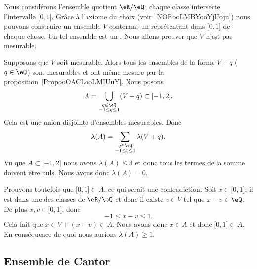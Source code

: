 \begin{example}      \label{EXooCZCFooRPgKjj}
	Nous considérons l'ensemble quotient \( \eR/\eQ\); chaque classe intersecte l'intervalle \( \mathopen[ 0 , 1 \mathclose]\). Grâce à l'axiome du choix (voir~\ref{NORooLMBYooYjUoju}) nous pouvons construire un ensemble \( V\) contenant un représentant dans \( \mathopen[ 0 , 1 \mathclose]\) de chaque classe. Un tel ensemble est un . Nous allons prouver que \( V\) n'est pas mesurable.

	Supposons que \( V\) soit mesurable. Alors tous les ensembles de la forme \( V+q\) (\( q\in \eQ\)) sont mesurables et ont même mesure par la proposition~\ref{PropooOACLooLMIUuY}. Nous posons
	\begin{equation}
		A=\bigcup_{\substack{q\in\eQ\\-1\leq q\leq 1}}(V+q)\subset\mathopen[ -1 , 2 \mathclose].
	\end{equation}
	Cela est une union disjointe d'ensembles mesurables. Donc
	\begin{equation}
		\lambda(A)=\sum_{\substack{q\in\eQ\\-1\leq q\leq 1}}\lambda(V+q).
	\end{equation}
	Vu que \( A\subset\mathopen[ -1 , 2 \mathclose]\) nous avons \( \lambda(A)\leq 3\) et donc tous les termes de la somme doivent être nuls. Nous avons donc \( \lambda(A)=0\).

	Prouvons toutefois que \( \mathopen[ 0 , 1 \mathclose]\subset A\), ce qui serait une contradiction. Soit \( x\in\mathopen[ 0 , 1 \mathclose]\); il est dans une des classes de \( \eR/\eQ\) et donc il existe \( v\in V\) tel que \( x-v\in \eQ\). De plus \( x,v\in \mathopen[ 0 , 1 \mathclose]\), donc
	\begin{equation}
		-1\leq x-v\leq 1.
	\end{equation}
	Cela fait que \( x\in V+(x-v)\subset A\). Nous avons donc \( x\in A\) et donc \( \mathopen[ 0 , 1 \mathclose]\subset A\). En conséquence de quoi nous aurions \( \lambda(A)\geq 1\).
\end{example}



\subsection{Ensemble de Cantor}

